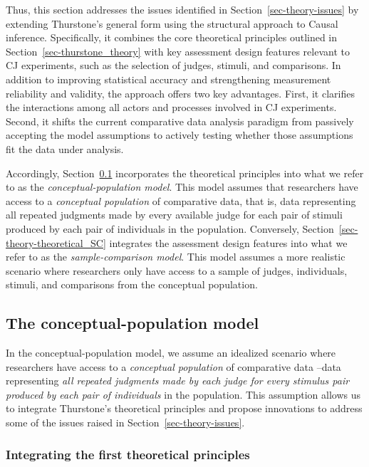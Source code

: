 \documentclass[
  authoryear,
  review,
  1p]{elsarticle}
\begin{document}
Thus, this section addresses the issues identified in
Section~\ref{sec-theory-issues} by extending Thurstone's general form
using the structural approach to Causal inference. Specifically, it
combines the core theoretical principles outlined in
Section~\ref{sec-thurstone_theory} with key assessment design features
relevant to CJ experiments, such as the selection of judges, stimuli,
and comparisons. In addition to improving statistical accuracy and
strengthening measurement reliability and validity, the approach offers
two key advantages. First, it clarifies the interactions among all
actors and processes involved in CJ experiments. Second, it shifts the
current comparative data analysis paradigm from passively accepting the
model assumptions to actively testing whether those assumptions fit the
data under analysis.

Accordingly, Section~\ref{sec-theory-theoretical_P} incorporates the
theoretical principles into what we refer to as the
\emph{conceptual-population model}. This model assumes that researchers
have access to a \emph{conceptual population} of comparative data, that
is, data representing all repeated judgments made by every available
judge for each pair of stimuli produced by each pair of individuals in
the population. Conversely, Section~\ref{sec-theory-theoretical_SC}
integrates the assessment design features into what we refer to as the
\emph{sample-comparison model}. This model assumes a more realistic
scenario where researchers only have access to a sample of judges,
individuals, stimuli, and comparisons from the conceptual population.

\subsection{The conceptual-population
model}\label{sec-theory-theoretical_P}

In the conceptual-population model, we assume an idealized scenario
where researchers have access to a \emph{conceptual population} of
comparative data --data representing \emph{all repeated judgments made
by each judge for every stimulus pair produced by each pair of
individuals} in the population. This assumption allows us to integrate
Thurstone's theoretical principles and propose innovations to address
some of the issues raised in Section~\ref{sec-theory-issues}.

\subsubsection{Integrating the first theoretical
principles}\label{sec-theory-theoretical_P1}
\end{document}
